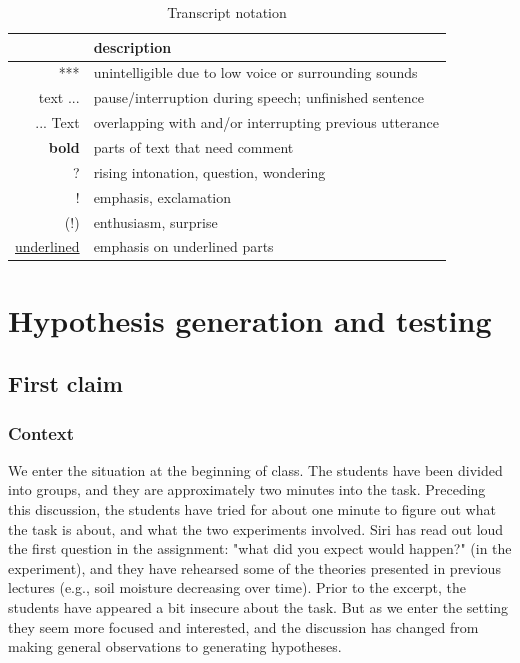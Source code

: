 \begin{table}[H]
	\begin{center}
		\begin{tabular}{r l} \toprule
			 &  description \\ \midrule 
			 *** & unintelligible due to low voice or surrounding sounds \\
			 text ... & pause/interruption during speech; unfinished sentence \\
			 ... Text & overlapping with and/or interrupting previous utterance \\
			 \textbf{bold} & parts of text that need comment \\
			 ? & rising intonation, question, wondering \\
			 ! & emphasis, exclamation \\
			 (!) & enthusiasm, surprise \\
			 \underline{underlined} & emphasis on underlined parts \\
			 \bottomrule

\end{tabular}
\end{center}
\caption{Transcript notation}
\end{table}


\section{Hypothesis generation and testing}
\label{cha:hypothesisgeneration}
\subsection{First claim}
\subsubsection*{Context}
\label{firsthypothesis}
We enter the situation at the beginning of class. The students have been divided into groups, and they are approximately two minutes into the task. Preceding this discussion, the students have tried for about one minute to figure out what the task is about, and what the two experiments involved. Siri has read out loud the first question in the assignment: "what did you expect would happen?" (in the experiment), and they have rehearsed some of the theories presented in previous lectures (e.g., soil moisture decreasing over time). Prior to the excerpt, the students have appeared a bit insecure about the task. But as we enter the setting they seem more focused and interested, and the discussion has changed from making general observations to generating hypotheses.

